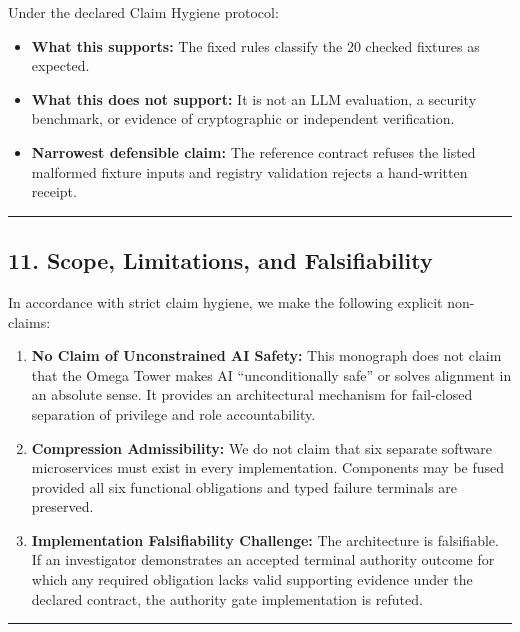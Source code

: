 \documentclass[
  10pt,
]{article}
\begin{document}
Under the declared Claim Hygiene protocol:

\begin{itemize}
\item
  \textbf{What this supports:} The fixed rules classify the 20 checked fixtures as expected.
\item
  \textbf{What this does not support:} It is not an LLM evaluation, a security benchmark, or evidence of cryptographic or independent verification.
\item
  \textbf{Narrowest defensible claim:} The reference contract refuses the listed malformed fixture inputs and registry validation rejects a hand-written receipt.
\end{itemize}

\begin{center}\rule{0.5\linewidth}{0.5pt}\end{center}

\subsection{11. Scope, Limitations, and Falsifiability}\label{scope-limitations-and-falsifiability}

In accordance with strict claim hygiene, we make the following explicit non-claims:

\begin{enumerate}
\def\labelenumi{\arabic{enumi}.}
\item
  \textbf{No Claim of Unconstrained AI Safety:} This monograph does not claim that the Omega Tower makes AI ``unconditionally safe'' or solves alignment in an absolute sense. It provides an architectural mechanism for fail-closed separation of privilege and role accountability.
\item
  \textbf{Compression Admissibility:} We do not claim that six separate software microservices must exist in every implementation. Components may be fused provided all six functional obligations and typed failure terminals are preserved.
\item
  \textbf{Implementation Falsifiability Challenge:} The architecture is falsifiable. If an investigator demonstrates an accepted terminal authority outcome for which any required obligation lacks valid supporting evidence under the declared contract, the authority gate implementation is refuted.
\end{enumerate}

\begin{center}\rule{0.5\linewidth}{0.5pt}\end{center}
\end{document}
